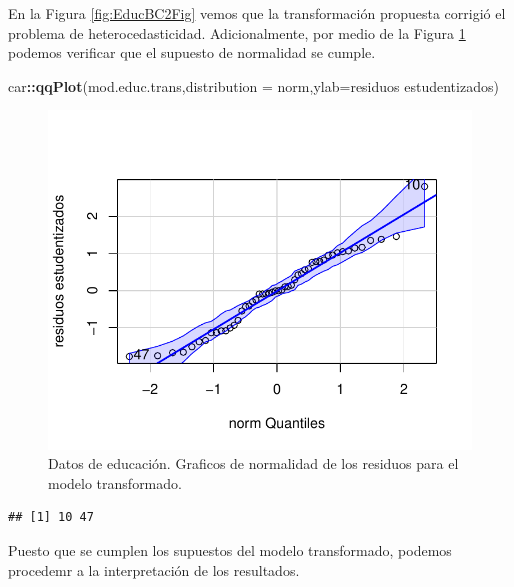 \documentclass[
]{article}
\newenvironment{Shaded}{\begin{snugshade}}{\end{snugshade}}
\newcommand{\AttributeTok}[1]{\textcolor[rgb]{0.13,0.29,0.53}{#1}}
\newcommand{\FunctionTok}[1]{\textcolor[rgb]{0.13,0.29,0.53}{\textbf{#1}}}
\newcommand{\NormalTok}[1]{#1}
\newcommand{\SpecialCharTok}[1]{\textcolor[rgb]{0.81,0.36,0.00}{\textbf{#1}}}
\newcommand{\StringTok}[1]{\textcolor[rgb]{0.31,0.60,0.02}{#1}}
\begin{document}
En la Figura \ref{fig:EducBC2Fig} vemos que la transformación propuesta corrigió el problema de heterocedasticidad. Adicionalmente, por medio de la Figura \ref{fig:EducBC3Fig} podemos verificar que el supuesto de normalidad se cumple.

\begin{Shaded}
\begin{Highlighting}[]
\NormalTok{car}\SpecialCharTok{::}\FunctionTok{qqPlot}\NormalTok{(mod.educ.trans,}\AttributeTok{distribution =} \StringTok{\textquotesingle{}norm\textquotesingle{}}\NormalTok{,}\AttributeTok{ylab=}\StringTok{\textquotesingle{}residuos estudentizados\textquotesingle{}}\NormalTok{)}
\end{Highlighting}
\end{Shaded}

\begin{figure}

{\centering \includegraphics{MLG1_files/figure-latex/EducBC3Fig-1} 

}

\caption{Datos de educación. Graficos de normalidad de los residuos para el modelo transformado.}\label{fig:EducBC3Fig}
\end{figure}

\begin{verbatim}
## [1] 10 47
\end{verbatim}

Puesto que se cumplen los supuestos del modelo transformado, podemos procedemr a la interpretación de los resultados.
\end{document}
